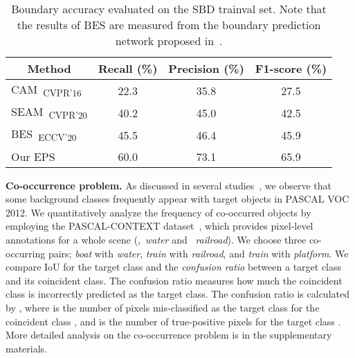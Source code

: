 \documentclass[final]{cvpr}
\begin{document}
 \begin{table}[]
\centering
{\small
\begin{tabular}{@{}lccc@{}}
\toprule
\multicolumn{1}{c}{Method}                      & Recall (\%) & Precision (\%) & F1-score (\%) \\ \midrule
\multicolumn{1}{l}{CAM~\cite{zhou2016learning}\textsubscript{CVPR'16}} & 22.3        & 35.8           & 27.5           \\
\multicolumn{1}{l}{SEAM~\cite{wang2020self}\textsubscript{CVPR'20}}    & 40.2        & 45.0           & 42.5           \\
\multicolumn{1}{l}{BES~\cite{chen2020boundary}\textsubscript{ECCV'20}} & 45.5        & 46.4           & 45.9           \\
\multicolumn{1}{l}{Our EPS}                        & 60.0        & 73.1          & 65.9           \\ \bottomrule
\end{tabular}
}
\vspace{2mm}
\caption{Boundary accuracy evaluated on the SBD trainval set. Note that the results of BES are measured from the boundary prediction network proposed in~\cite{chen2020boundary}.} \vspace{-2mm}
\label{tab:boundary}
\end{table} 
\vspace{1mm}
\noindent \textbf{Co-occurrence problem.} As discussed in several studies~\cite{huang2018weakly, kolesnikov2016seed, li2018tell, oh2017exploiting}, we observe that some background classes frequently appear with target objects in PASCAL VOC 2012. We quantitatively analyze the frequency of co-occurred objects by employing the PASCAL-CONTEXT dataset~\cite{mottaghi2014role}, which provides pixel-level annotations for a whole scene (\eg,~\emph{water} and ~\emph{railroad}). We choose three co-occurring pairs; \emph{boat} with \emph{water}, \emph{train} with \emph{railroad}, and \emph{train} with \emph{platform}. We compare IoU for the target class and the \emph{confusion ratio} between a target class and its coincident class. The confusion ratio measures how much the coincident class is incorrectly predicted as the target class. The confusion ratio  is calculated by , where  is the number of pixels mis-classified as the target class  for the coincident class , and  is the number of true-positive pixels for the target class . More detailed analysis on the co-occurrence problem is in the supplementary materials.
\end{document}
